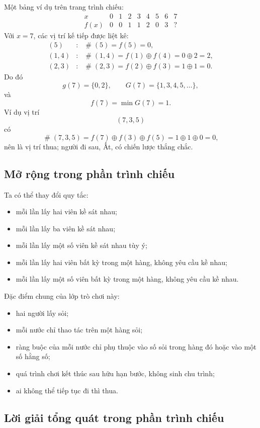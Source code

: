 \documentclass[11pt]{article}
\newcommand{\nimadd}{\oplus}
\newcommand{\val}[1]{\mathop{\#}\!#1}
\begin{document}
Một bảng ví dụ trên trang trình chiếu:
\[
\begin{array}{c|cccccccc}
x&0&1&2&3&4&5&6&7\\ \hline
f(x)&0&0&1&1&2&0&3&?
\end{array}
\]
Với \(x=7\), các vị trí kế tiếp được liệt kê:
\[
\begin{array}{rcl}
(5)&:&\val{(5)}=f(5)=0,\\
(1,4)&:&\val{(1,4)}=f(1)\nimadd f(4)=0\nimadd2=2,\\
(2,3)&:&\val{(2,3)}=f(2)\nimadd f(3)=1\nimadd1=0.
\end{array}
\]
Do đó
\[
  g(7)=\{0,2\},\qquad G(7)=\{1,3,4,5,\ldots\},
\]
và
\[
  f(7)=\min G(7)=1.
\]
Ví dụ vị trí
\[
  (7,3,5)
\]
có
\[
  \val{(7,3,5)}=f(7)\nimadd f(3)\nimadd f(5)=1\nimadd1\nimadd0=0,
\]
nên là vị trí thua; người đi sau, Ất, có chiến lược thắng chắc.

\subsection{Mở rộng trong phần trình chiếu}

Ta có thể thay đổi quy tắc:
\begin{itemize}
  \item mỗi lần lấy hai viên kề sát nhau;
  \item mỗi lần lấy ba viên kề sát nhau;
  \item mỗi lần lấy một số viên kề sát nhau tùy ý;
  \item mỗi lần lấy hai viên bất kỳ trong một hàng, không yêu cầu kề nhau;
  \item mỗi lần lấy một số viên bất kỳ trong một hàng, không yêu cầu kề nhau.
\end{itemize}
Đặc điểm chung của lớp trò chơi này:
\begin{itemize}
  \item hai người lấy sỏi;
  \item mỗi nước chỉ thao tác trên một hàng sỏi;
  \item ràng buộc của mỗi nước chỉ phụ thuộc vào số sỏi trong hàng đó hoặc
  vào một số hằng số;
  \item quá trình chơi kết thúc sau hữu hạn bước, không sinh chu trình;
  \item ai không thể tiếp tục đi thì thua.
\end{itemize}

\subsection{Lời giải tổng quát trong phần trình chiếu}
\end{document}
